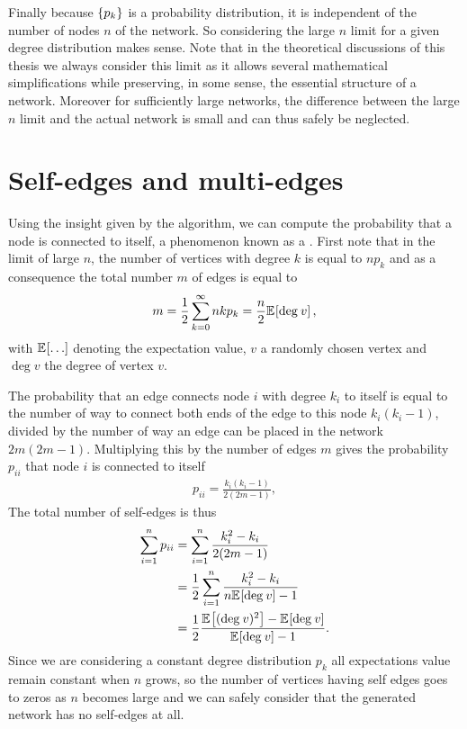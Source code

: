 \documentclass[
11pt, %
american, %
singlespacing, %
final, %
nolistspacing, %
liststotoc, %
headsepline, %
]{MastersDoctoralThesis} %
\begin{document}
Finally because $\{p_k\}$ is a probability distribution, it is independent of the number of nodes $n$ of the network. So considering the large $n$ limit for a given degree distribution makes sense. Note that in the theoretical discussions of this thesis we always consider this limit as it allows several mathematical simplifications while preserving, in some sense, the essential structure of a network. Moreover for sufficiently large networks, the difference between the large $n$ limit and the actual network is small and can thus safely be neglected.

\section{Self-edges and multi-edges}

Using the insight given by the algorithm, we can compute the probability that a node is connected to itself, a phenomenon known as a . First note that in the limit of large $n$, the number of vertices with degree $k$ is equal to $n p_k$ and as a consequence the total number $m$ of edges is equal to
\begin{align}
	m = \frac{1}{2} \sum_{k = 0}^\infty n k p_k = \frac{n}{2} \mathbb{E}_{}\!\left[ \mathrm{deg}_{}\, v \right], \label{Total number of edges}
\end{align}
with $\expected{\dots}$ denoting the expectation value, $v$ a randomly chosen vertex and $\deg{v}$ the degree of vertex $v$.

The probability that an edge connects node $i$ with degree $k_i$ to itself is equal to the number of way to connect both ends of the edge to this node $k_i (k_i - 1)$, divided by the number of way an edge can be placed in the network $2 m (2 m - 1)$. Multiplying this by the number of edges $m$ gives the probability $p_{ii}$ that node $i$ is connected to itself
\begin{align}
	p_{ii} = \frac{k_i (k_i - 1)}{2 (2m - 1)},
\end{align}
The total number of self-edges is thus
\begin{align}
	\sum_{i=1}^n p_{ii} &= \sum_{i=1}^n \frac{k_i^2 - k_i}{2 (2m - 1)} \\
	&= \frac{1}{2} \sum_{i=1}^n \frac{k_i^2 - k_i}{n \mathbb{E}_{}\!\left[ \mathrm{deg}_{}\, v \right] - 1} \\
	&= \frac{1}{2} \frac{\mathbb{E}_{}\!\left[ (\mathrm{deg}_{}\, v)^2 \right] - \mathbb{E}_{}\!\left[ \mathrm{deg}_{}\, v \right]}{\mathbb{E}_{}\!\left[ \mathrm{deg}_{}\, v \right] - 1}.
\end{align}
Since we are considering a constant degree distribution $p_k$ all expectations value remain constant when $n$ grows, so the number of vertices having self edges goes to zeros as $n$ becomes large and we can safely consider that the generated network has no self-edges at all.
\end{document}

